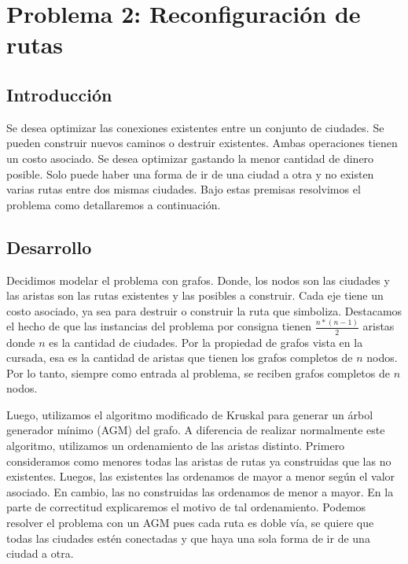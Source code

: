 \section{Problema 2: Reconfiguraci\'on de rutas}

\subsection{Introducci\'on}

\quad Se desea optimizar las conexiones existentes entre un conjunto de ciudades. Se pueden construir nuevos caminos o destruir existentes. Ambas operaciones tienen un costo asociado. Se desea optimizar gastando la menor cantidad de dinero posible. Solo puede haber una forma de ir de una ciudad a otra y no existen varias rutas entre dos mismas ciudades. Bajo estas premisas resolvimos el problema como detallaremos a continuación.


\subsection{Desarrollo}

\quad Decidimos modelar el problema con grafos. Donde, los nodos son las ciudades y las aristas son las rutas existentes y las posibles a construir. Cada eje tiene un costo asociado, ya sea para destruir o construir la ruta que simboliza. Destacamos el hecho de que las instancias del problema por consigna tienen $ \frac{n * (n - 1)}{2} $ aristas donde $ n $ es la cantidad de ciudades. Por la propiedad de grafos vista en la cursada, esa es la cantidad de aristas que tienen los grafos completos de $ n $ nodos. Por lo tanto, siempre como entrada al problema, se reciben grafos completos de $ n $ nodos.

\quad

\quad Luego, utilizamos el algoritmo modificado de Kruskal para generar un \'arbol generador m\'inimo (AGM) del grafo. A diferencia de realizar normalmente este algoritmo, utilizamos un ordenamiento de las aristas distinto. Primero consideramos como menores todas las aristas de rutas ya construidas que las no existentes. Luegos, las existentes las ordenamos de mayor a menor según el valor asociado. En cambio, las no construidas las ordenamos de menor a mayor. En la parte de correctitud explicaremos el motivo de tal ordenamiento. Podemos resolver el problema con un AGM pues cada ruta es doble vía, se quiere que todas las ciudades est\'en conectadas y que haya una sola forma de ir de una ciudad a otra.

